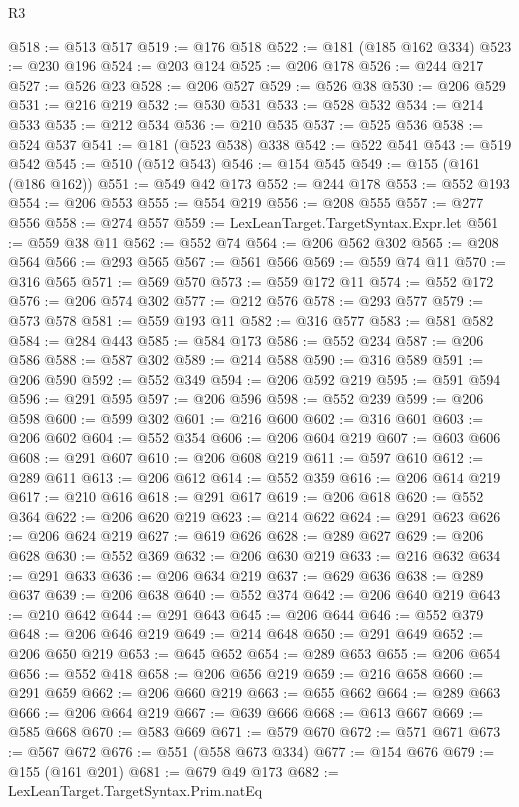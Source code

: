 \begin{lexlean}{R3}
\begin{coremodule}
@518 := @513 @517
@519 := @176 @518
@522 := @181 (@185 @162 @334)
@523 := @230 @196
@524 := @203 @124
@525 := @206 @178
@526 := @244 @217
@527 := @526 @23
@528 := @206 @527
@529 := @526 @38
@530 := @206 @529
@531 := @216 @219
@532 := @530 @531
@533 := @528 @532
@534 := @214 @533
@535 := @212 @534
@536 := @210 @535
@537 := @525 @536
@538 := @524 @537
@541 := @181 (@523 @538) @338
@542 := @522 @541
@543 := @519 @542
@545 := @510 (@512 @543)
@546 := @154 @545
@549 := @155 (@161 (@186 @162))
@551 := @549 @42 @173
@552 := @244 @178
@553 := @552 @193
@554 := @206 @553
@555 := @554 @219
@556 := @208 @555
@557 := @277 @556
@558 := @274 @557
@559 := LexLeanTarget.TargetSyntax.Expr.let
@561 := @559 @38 @11
@562 := @552 @74
@564 := @206 @562 @302
@565 := @208 @564
@566 := @293 @565
@567 := @561 @566
@569 := @559 @74 @11
@570 := @316 @565
@571 := @569 @570
@573 := @559 @172 @11
@574 := @552 @172
@576 := @206 @574 @302
@577 := @212 @576
@578 := @293 @577
@579 := @573 @578
@581 := @559 @193 @11
@582 := @316 @577
@583 := @581 @582
@584 := @284 @443
@585 := @584 @173
@586 := @552 @234
@587 := @206 @586
@588 := @587 @302
@589 := @214 @588
@590 := @316 @589
@591 := @206 @590
@592 := @552 @349
@594 := @206 @592 @219
@595 := @591 @594
@596 := @291 @595
@597 := @206 @596
@598 := @552 @239
@599 := @206 @598
@600 := @599 @302
@601 := @216 @600
@602 := @316 @601
@603 := @206 @602
@604 := @552 @354
@606 := @206 @604 @219
@607 := @603 @606
@608 := @291 @607
@610 := @206 @608 @219
@611 := @597 @610
@612 := @289 @611
@613 := @206 @612
@614 := @552 @359
@616 := @206 @614 @219
@617 := @210 @616
@618 := @291 @617
@619 := @206 @618
@620 := @552 @364
@622 := @206 @620 @219
@623 := @214 @622
@624 := @291 @623
@626 := @206 @624 @219
@627 := @619 @626
@628 := @289 @627
@629 := @206 @628
@630 := @552 @369
@632 := @206 @630 @219
@633 := @216 @632
@634 := @291 @633
@636 := @206 @634 @219
@637 := @629 @636
@638 := @289 @637
@639 := @206 @638
@640 := @552 @374
@642 := @206 @640 @219
@643 := @210 @642
@644 := @291 @643
@645 := @206 @644
@646 := @552 @379
@648 := @206 @646 @219
@649 := @214 @648
@650 := @291 @649
@652 := @206 @650 @219
@653 := @645 @652
@654 := @289 @653
@655 := @206 @654
@656 := @552 @418
@658 := @206 @656 @219
@659 := @216 @658
@660 := @291 @659
@662 := @206 @660 @219
@663 := @655 @662
@664 := @289 @663
@666 := @206 @664 @219
@667 := @639 @666
@668 := @613 @667
@669 := @585 @668
@670 := @583 @669
@671 := @579 @670
@672 := @571 @671
@673 := @567 @672
@676 := @551 (@558 @673 @334)
@677 := @154 @676
@679 := @155 (@161 @201)
@681 := @679 @49 @173
@682 := LexLeanTarget.TargetSyntax.Prim.natEq

\end{coremodule}
\end{lexlean}

